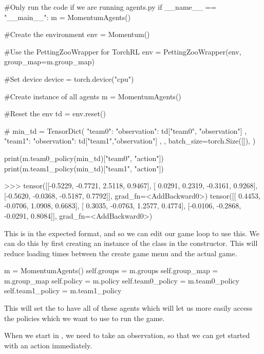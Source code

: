\begin{mpy}
#Only run the code if we are running agents.py
if __name__ == "__main__":
    m = MomentumAgents()

    #Create the environment
    env = Momentum()

    #Use the PettingZooWrapper for TorchRL
    env = PettingZooWrapper(env, group_map=m.group_map)

    #Set device
    device = torch.device("cpu")

    #Create instance of all agents
    m = MomentumAgents()

    #Reset the env
    td = env.reset()

    #
    min_td = TensorDict(
        {
        "team0": 
            {
                "observation": td["team0", "observation"]
            },
        "team1": 
            {
                "observation": td["team1","observation"]
            },
        }, 
        batch_size=torch.Size([]),
    )

    print(m.team0_policy(min_td)["team0", "action"])
    print(m.team1_policy(min_td)["team1", "action"])

>>> 
tensor([[-0.5229, -0.7721,  2.5118,  0.9467],
        [ 0.0291,  0.2319, -0.3161,  0.9268],
        [-0.5620, -0.0368, -0.5187,  0.7792]], grad_fn=<AddBackward0>)
tensor([[ 0.4453, -0.0706,  1.0908,  0.6683],
        [ 0.3035, -0.0763,  1.2577,  0.4774],
        [-0.0106, -0.2868, -0.0291,  0.8084]], grad_fn=<AddBackward0>)
\end{mpy}

This is in the expected format, and so we can edit our game loop to use this. We can do this by first creating an instance of the  class in the constructor. This will reduce loading times between the create game menu and the actual game.

\begin{mpy}
        m = MomentumAgents()
        self.groups = m.groups
        self.group_map = m.group_map
        self.policy = m.policy
        self.team0_policy = m.team0_policy
        self.team1_policy = m.team1_policy
\end{mpy}

This will set the  to have all of these agents which will let us more easily access the policies which we want to use to run the game.

\vs
When we start in , we need to take an observation, so that we can get started with an action immediately.

